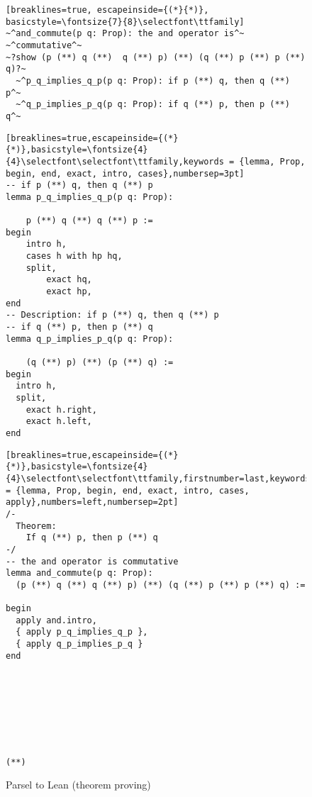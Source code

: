 \begin{figure}
\begin{minipage}{\textwidth}
\begin{minipage}{0.44\textwidth}
\centering
\begin{lstlisting}[breaklines=true, escapeinside={(*}{*)}, basicstyle=\fontsize{7}{8}\selectfont\ttfamily]
~^and_commute(p q: Prop): the and operator is^~ ~^commutative^~
~?show (p (**) q (**)  q (**) p) (**) (q (**) p (**) p (**) q)?~
  ~^p_q_implies_q_p(p q: Prop): if p (**) q, then q (**) p^~
  ~^q_p_implies_p_q(p q: Prop): if q (**) p, then p (**) q^~
\end{lstlisting}
\end{minipage}\hfill \hspace{1px}{\Large }\hspace{2px} \hfill
\begin{minipage}{0.24\textwidth}
\begin{lstlisting}[breaklines=true,escapeinside={(*}{*)},basicstyle=\fontsize{4}{4}\selectfont\selectfont\ttfamily,keywords = {lemma, Prop, begin, end, exact, intro, cases},numbersep=3pt]
-- if p (**) q, then q (**) p
lemma p_q_implies_q_p(p q: Prop):

    p (**) q (**) q (**) p :=
begin
    intro h,
    cases h with hp hq,
    split,
        exact hq,
        exact hp,
end
-- Description: if p (**) q, then q (**) p
-- if q (**) p, then p (**) q
lemma q_p_implies_p_q(p q: Prop):

    (q (**) p) (**) (p (**) q) :=
begin
  intro h,
  split,
    exact h.right,
    exact h.left,
end
\end{lstlisting}
\end{minipage}\hspace{0.015\textwidth}
\begin{minipage}{0.24\textwidth}
\centering
\begin{lstlisting}[breaklines=true,escapeinside={(*}{*)},basicstyle=\fontsize{4}{4}\selectfont\selectfont\ttfamily,firstnumber=last,keywords = {lemma, Prop, begin, end, exact, intro, cases, apply},numbers=left,numbersep=2pt]
/-
  Theorem:
    If q (**) p, then p (**) q
-/
-- the and operator is commutative
lemma and_commute(p q: Prop):
  (p (**) q (**) q (**) p) (**) (q (**) p (**) p (**) q) :=

begin
  apply and.intro,
  { apply p_q_implies_q_p },
  { apply q_p_implies_p_q }
end








(**)
\end{lstlisting}
\end{minipage}
\vspace{-10px}
\caption{Parsel to Lean (theorem proving)}
\label{leanandexample}
\vspace{1px}
\end{minipage} \end{figure}

